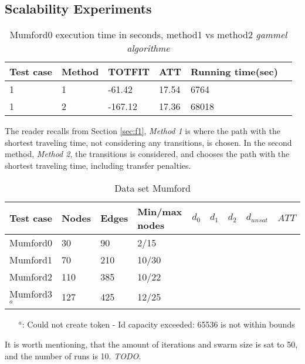 \subsection{Scalability Experiments}
\label{subsec:scalabilityExperiments_results}

\begin{table}[H]
    \centering
    \begin{tabular}{|l|l|l|l|l|l|}
        \hline
        Test case & Method & TOTFIT & ATT & Running time(sec) \\
        \hline
        1 & 1 & -61.42 & 17.54 & 6764 \\
        1 & 2 & -167.12 & 17.36 & 68018 \\
        
        \hline
    \end{tabular}
    \caption{Mumford0 execution time in seconds, method1 vs method2 \emph{\color{blue} gammel algorithme}}
    \label{table:results_mumford}
\end{table}

The reader recalls from Section \vref{sec:f1},  \textit{Method 1} is where the path with the shortest traveling time, not considering any transitions, is chosen. In the second method, \textit{Method 2}, the transitions is considered, and chooses the path with the shortest traveling time, including transfer penalties.





\begin{table}[H]
    \centering
    \hspace*{-1.0cm}
    \begin{tabular}{|l|l|l|l|l|l|l|l|l|}
        \hline
        Test case & Nodes & Edges & Min/max nodes  & $d_0$ & $d_1$ & $d_2$ & $d_{unsat}$ & $ATT$\\
        \hline
        Mumford0 & 30 & 90 & 2/15 & & & & &\\
        Mumford1 & 70 & 210 & 10/30 & & & & &\\
        Mumford2 & 110 & 385 & 10/22 & & & & &\\
        Mumford3$^a$ & 127 & 425 & 12/25 & & & & &\\
        \hline
    \end{tabular}
    \caption{Data set Mumford}
    \begin{itemize}[noitemsep]
    \item[$^a$:] Could not create token - Id capacity exceeded: 65536 is not within bounds
    \end{itemize}
    \label{table:dataSet_mumford}
\end{table}
It is worth mentioning, that the amount of iterations and swarm size is sat to 50, and the number of runs is 10. \emph{\color{blue} TODO.}